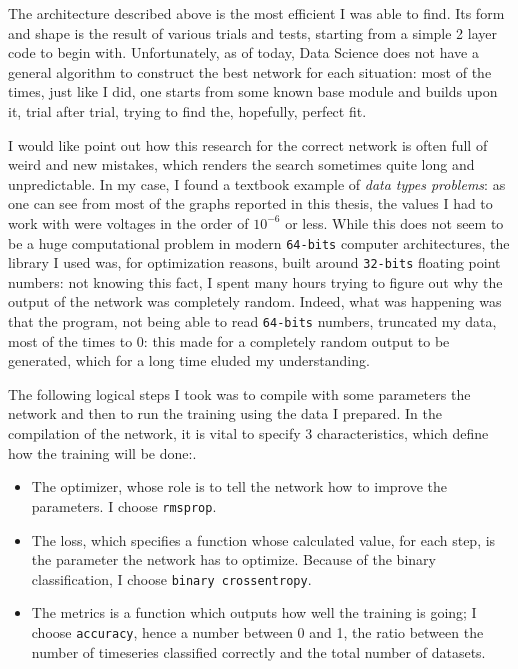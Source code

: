 \documentclass[12pt,a4paper,final]{book}			%
\begin{document}
			The architecture described above is the most efficient I was able to find. Its form and shape is the result of various trials and tests, starting from a simple 2 layer code to begin with. 
			Unfortunately, as of today, Data Science does not have a general algorithm to construct the best network for each situation: most of the times, just like I did, one starts from some known base module and builds upon it, trial after trial, trying to find the, hopefully, perfect fit.			
			
			I would like point out how this research for the correct network is often full of weird and new mistakes, which renders the search sometimes quite long and unpredictable. In my case, I found a textbook example of \textit{data types problems}: as one can see from most of the graphs reported in this thesis, the values I had to work with were voltages in the order of $10^{-6}$ or less. While this does not seem to be a huge computational problem in modern \texttt{64-bits} computer architectures, the library I used was, for optimization reasons, built around \texttt{32-bits} floating point numbers: not knowing this fact, I spent many hours trying to figure out why the output of the network was completely random. Indeed, what was happening was that the program, not being able to read \texttt{64-bits} numbers, truncated my data, most of the times to $0$: this made for a completely random output to be generated, which for a long time eluded my understanding. 			
			
			The following logical steps I took was to compile with some parameters the network and then to run the training using the data I prepared.
			In the compilation of the network, it is vital to specify 3 characteristics, which define how the training will be done:\cite{chollet}.
			\begin{itemize}
				\item The optimizer, whose role is to tell the network how to improve the parameters. I choose \texttt{rmsprop}.
				\item The loss, which specifies a function whose calculated value, for each step, is the parameter the network has to optimize. Because of the binary classification, I choose \texttt{binary crossentropy}.
				\item The metrics is a function which outputs how well the training is going; I choose \texttt{accuracy}, hence a number between 0 and 1, the ratio between the number of timeseries classified correctly and the total number of datasets.
			\end{itemize}
			
\end{document}
